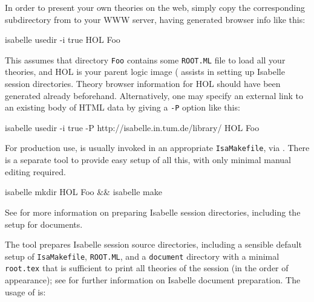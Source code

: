\begin{isabellebody}
\begin{isamarkuptext}
  \medskip In order to present your own theories on the web, simply
  copy the corresponding subdirectory from \hyperlink{setting.ISABELLE-BROWSER-INFO}{\mbox{}} to your WWW server, having generated browser
  info like this:
\begin{ttbox}
isabelle usedir -i true HOL Foo
\end{ttbox}

  This assumes that directory \verb|Foo| contains some \verb|ROOT.ML| file to load all your theories, and HOL is your parent
  logic image (\hyperlink{tool.mkdir}{\mbox{}} assists in setting up Isabelle
  session directories.  Theory browser information for HOL should have
  been generated already beforehand.  Alternatively, one may specify
  an external link to an existing body of HTML data by giving \hyperlink{tool.usedir}{\mbox{}} a \verb|-P| option like this:
\begin{ttbox}
isabelle usedir -i true -P http://isabelle.in.tum.de/library/ HOL Foo
\end{ttbox}

  \medskip For production use, \hyperlink{tool.usedir}{\mbox{}} is usually invoked in an
  appropriate \verb|IsaMakefile|, via \hyperlink{tool.make}{\mbox{}}.  There is a
  separate \hyperlink{tool.mkdir}{\mbox{}} tool to provide easy setup of all this, with
  only minimal manual editing required.
\begin{ttbox}
isabelle mkdir HOL Foo && isabelle make
\end{ttbox}
  See  for more information on preparing
  Isabelle session directories, including the setup for documents.%
\end{isamarkuptext}%
\isamarkuptrue%
%
\isamarkuptrue%
%
\begin{isamarkuptext}%
The \hypertarget{tool.mkdir}{\hyperlink{tool.mkdir}{\mbox{}}} tool prepares Isabelle session source
  directories, including a sensible default setup of \verb|IsaMakefile|, \verb|ROOT.ML|, and a \verb|document|
  directory with a minimal \verb|root.tex| that is sufficient to
  print all theories of the session (in the order of appearance); see
   for further information on Isabelle
  document preparation.  The usage of \hyperlink{tool.mkdir}{\mbox{}} is:


\end{isamarkuptext}
\end{isabellebody}
